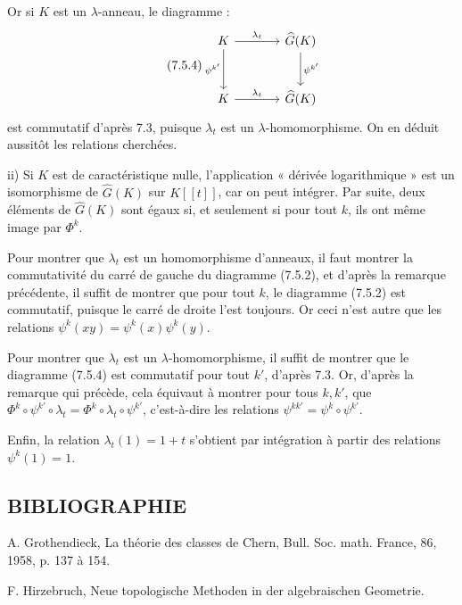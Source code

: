 

Or si \(K\) est un \(\lambda\)-anneau, le diagramme :
\begin{equation}\tag{7.5.4}
\begin{tikzcd}[column sep=large,row sep=large]
K \arrow[r,"\lambda_t"] \arrow[d,"\psi^{k'}"'] &
\widehat G(K) \arrow[d,"\psi^{k'}"]\\
K \arrow[r,"\lambda_t"] &
\widehat G(K)
\end{tikzcd}
\end{equation}
est commutatif d'après 7.3, puisque \(\lambda_t\) est un \(\lambda\)-homomorphisme. On en déduit aussitôt les relations cherchées.

ii) Si \(K\) est de caractéristique nulle, l'application « dérivée logarithmique » est un isomorphisme de \(\widehat G(K)\) sur \(K[[t]]\), car on peut intégrer. Par suite, deux éléments de \(\widehat G(K)\) sont égaux si, et seulement si pour tout \(k\), ils ont même image par \(\Phi^k\).

Pour montrer que \(\lambda_t\) est un homomorphisme d'anneaux, il faut montrer la commutativité du carré de gauche du diagramme (7.5.2), et d'après la remarque précédente, il suffit de montrer que pour tout \(k\), le diagramme (7.5.2) est commutatif, puisque le carré de droite l'est toujours. Or ceci n'est autre que les relations \(\psi^k(xy)=\psi^k(x)\psi^k(y)\).

Pour montrer que \(\lambda_t\) est un \(\lambda\)-homomorphisme, il suffit de montrer que le diagramme (7.5.4) est commutatif pour tout \(k'\), d'après 7.3. Or, d'après la remarque qui précède, cela équivaut à montrer pour tous \(k,k'\), que \(\Phi^k\circ\psi^{k'}\circ\lambda_t=\Phi^k\circ\lambda_t\circ\psi^{k'}\), c'est-à-dire les relations \(\psi^{kk'}=\psi^k\circ\psi^{k'}\).

Enfin, la relation \(\lambda_t(1)=1+t\) s'obtient par intégration à partir des relations \(\psi^k(1)=1\).

\subsection*{BIBLIOGRAPHIE}
\begin{enumerate}[label={[\arabic*]}]
\item A. Grothendieck, La théorie des classes de Chern, Bull. Soc. math. France, 86, 1958, p. 137 à 154.
\item F. Hirzebruch, Neue topologische Methoden in der algebraischen Geometrie.
\end{enumerate}



